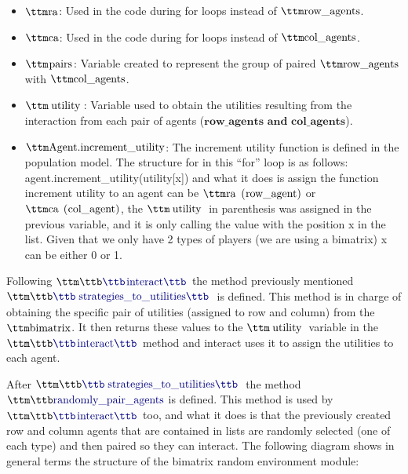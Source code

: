 \begin{itemize}
\item $\pythoninline{ra}$: Used in the code during for loops instead of $\pythoninline{row\_agents}$.
\item $\pythoninline{ca}$: Used in the code during for loops instead of $\pythoninline{col\_agents}$.
\item $\pythoninline{pairs}$: Variable created to represent the group of paired $\pythoninline{row\_agents}$ with $\pythoninline{col\_agents}$.
\item $\pythoninline{utility}$: Variable used to obtain the utilities resulting from the interaction from each pair of agents ($\textbf{row\_agents and col\_agents}$).
\item $\pythoninline{Agent.increment\_utility}$: The increment utility function is defined in the population model. The structure for in this “for” loop is as follows:
\\ agent.increment\_utility(utility[x]) and what it does is assign the function increment utility to an agent can be $\pythoninline{ra (row\_agent)}$ or$\pythoninline{ ca (col\_agent)}$, the $\pythoninline{utility}$ in parenthesis was assigned in the previous variable, and it is only calling the value with the position x in the list. Given that we only have 2 types of players (we are using a bimatrix) x can be either 0 or 1.
\end{itemize}

Following $\pythoninline{interact}$ the method previously mentioned $\pythoninline{strategies\_to\_utilities}$ is defined. This method is in charge of obtaining the specific pair of utilities (assigned to row and column) from the $\pythoninline{bimatrix}$. It then returns these values to the $\pythoninline{utility}$ variable in the $\pythoninline{interact}$ method and interact uses it to assign the utilities to each agent.

After $\pythoninline{strategies\_to\_utilities}$ the method $\pythoninline{randomly\_pair\_agents}$ is defined. This method is used by $\pythoninline{interact}$ too, and what it does is that the previously created row and column agents that are contained in lists are randomly selected (one of each type) and then paired so they can interact. The following diagram shows in general terms the structure of the bimatrix random environment module:

